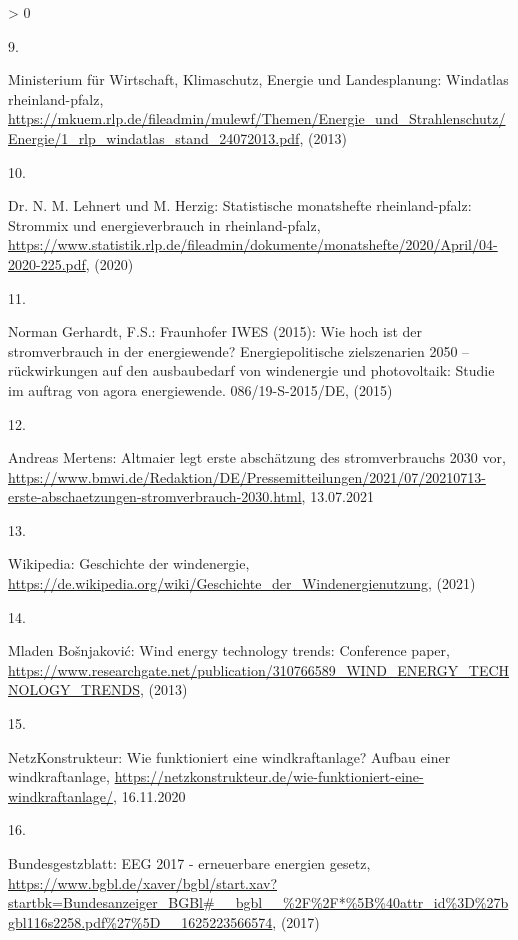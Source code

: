 \documentclass[a4paper,11pt]{article}
\newlength{\cslhangindent}
\newlength{\csllabelwidth}
\newenvironment{CSLReferences}[3] %
 {%
  \setlength{\parindent}{0pt}
  \ifodd #1 \everypar{\setlength{\hangindent}{\cslhangindent}}\ignorespaces\fi
  \ifnum #2 > 0
  \setlength{\parskip}{#2\baselineskip}
  \fi
 }%
 {}
\newcommand{\CSLLeftMargin}[1]{\parbox[t]{\maxof{\widthof{#1}}{\csllabelwidth}}{#1}}
\newcommand{\CSLRightInline}[1]{\parbox[t]{\linewidth}{#1}}
\begin{document}
\begin{CSLReferences}{0}{0}
\leavevmode\hypertarget{ref-MinisteriumfurWirtschaftKlimaschutzEnergieundLandesplanung.2013}{}%
\CSLLeftMargin{9. }
\CSLRightInline{Ministerium für Wirtschaft, Klimaschutz, Energie und Landesplanung: Windatlas rheinland-pfalz, \url{https://mkuem.rlp.de/fileadmin/mulewf/Themen/Energie_und_Strahlenschutz/Energie/1_rlp_windatlas_stand_24072013.pdf}, (2013)}

\leavevmode\hypertarget{ref-Lehnert.2020}{}%
\CSLLeftMargin{10. }
\CSLRightInline{Dr. N. M. Lehnert und M. Herzig: Statistische monatshefte rheinland-pfalz: Strommix und energieverbrauch in rheinland-pfalz, \url{https://www.statistik.rlp.de/fileadmin/dokumente/monatshefte/2020/April/04-2020-225.pdf}, (2020)}

\leavevmode\hypertarget{ref-NormanGerhardt.2015}{}%
\CSLLeftMargin{11. }
\CSLRightInline{Norman Gerhardt, F.S.: Fraunhofer IWES (2015): Wie hoch ist der stromverbrauch in der energiewende? Energiepolitische zielszenarien 2050 -- r{ü}ckwirkungen auf den ausbaubedarf von windenergie und photovoltaik: Studie im auftrag von agora energiewende. 086/19-S-2015/DE, (2015)}

\leavevmode\hypertarget{ref-AndreasMertens.13.07.2021}{}%
\CSLLeftMargin{12. }
\CSLRightInline{Andreas Mertens: Altmaier legt erste absch{ä}tzung des stromverbrauchs 2030 vor, \url{https://www.bmwi.de/Redaktion/DE/Pressemitteilungen/2021/07/20210713-erste-abschaetzungen-stromverbrauch-2030.html}, 13.07.2021}

\leavevmode\hypertarget{ref-Wikipedia.2021}{}%
\CSLLeftMargin{13. }
\CSLRightInline{Wikipedia: Geschichte der windenergie, \url{https://de.wikipedia.org/wiki/Geschichte_der_Windenergienutzung}, (2021)}

\leavevmode\hypertarget{ref-MladenBosnjakovic.2013}{}%
\CSLLeftMargin{14. }
\CSLRightInline{Mladen Bošnjaković: Wind energy technology trends: Conference paper, \url{https://www.researchgate.net/publication/310766589_WIND_ENERGY_TECHNOLOGY_TRENDS}, (2013)}

\leavevmode\hypertarget{ref-NetzKonstrukteur.16.11.2020}{}%
\CSLLeftMargin{15. }
\CSLRightInline{NetzKonstrukteur: Wie funktioniert eine windkraftanlage? Aufbau einer windkraftanlage, \url{https://netzkonstrukteur.de/wie-funktioniert-eine-windkraftanlage/}, 16.11.2020}

\leavevmode\hypertarget{ref-Bundesgestzblatt.2017}{}%
\CSLLeftMargin{16. }
\CSLRightInline{Bundesgestzblatt: EEG 2017 - erneuerbare energien gesetz, \url{https://www.bgbl.de/xaver/bgbl/start.xav?startbk=Bundesanzeiger_BGBl\#__bgbl__\%2F\%2F*\%5B\%40attr_id\%3D\%27bgbl116s2258.pdf\%27\%5D__1625223566574}, (2017)}


\end{CSLReferences}
\end{document}
